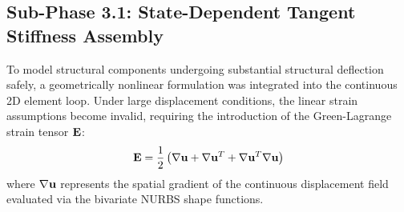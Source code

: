 \subsection{Sub-Phase 3.1: State-Dependent Tangent Stiffness Assembly}
\label{subsec:tangent_stiff}

To model structural components undergoing substantial structural deflection safely, a geometrically nonlinear formulation was integrated into the continuous 2D element loop. Under large displacement conditions, the linear strain assumptions become invalid, requiring the introduction of the Green-Lagrange strain tensor $\mathbf{E}$:
\begin{equation}
    \mathbf{E} = \frac{1}{2} \left( \nabla \mathbf{u} + \nabla \mathbf{u}^T + \nabla \mathbf{u}^T \nabla \mathbf{u} \right)
\end{equation}
where $\nabla \mathbf{u}$ represents the spatial gradient of the continuous displacement field evaluated via the bivariate NURBS shape functions. 

